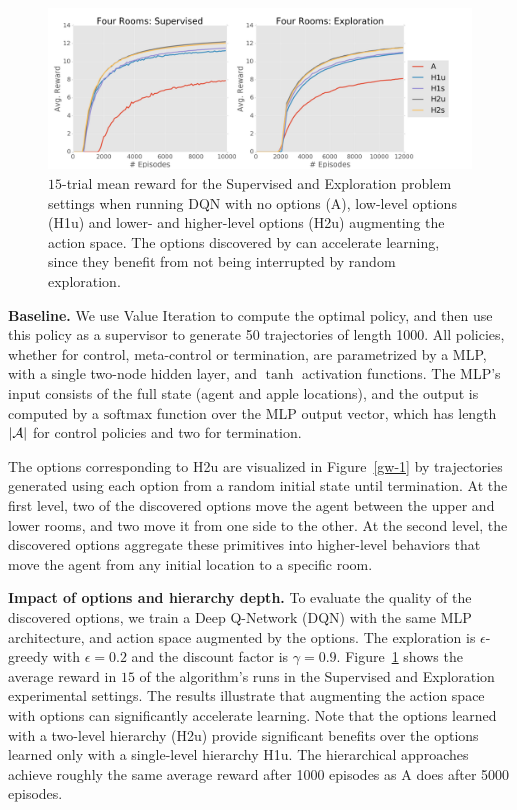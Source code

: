 \begin{figure}[ht!]
    \centering
    \includegraphics[width=\columnwidth]{ddco-experiments/4-rooms-clean.png}
    \caption{$15$-trial mean reward for the Supervised and Exploration problem settings when running DQN with no options (\textsf{A}), low-level options (\textsf{H1u}) and lower- and higher-level options (\textsf{H2u}) augmenting the action space. The options discovered by \alg can accelerate learning, since they benefit from not being interrupted by random exploration.  \label{gw-2}}
\end{figure}

{\bf Baseline.} We use Value Iteration to compute the optimal policy, and then use this policy as a supervisor to generate 50 trajectories of length 1000. All policies, whether for control, meta-control or termination, are parametrized by a MLP, with a single two-node hidden layer, and $\tanh$ activation functions. The MLP's input consists of the full state (agent and apple locations), and the output is computed by a $\mathrm{softmax}$ function over the MLP output vector, which has length $|\mathcal{A}|$ for control policies and two for termination.

The options corresponding to \textsf{H2u} are visualized in Figure~\ref{gw-1} by trajectories generated using each option from a random initial state until termination. At the first level, two of the discovered options move the agent between the upper and lower rooms, and two move it from one side to the other. At the second level, the discovered options aggregate these primitives into higher-level behaviors that move the agent from any initial location to a specific room.

{\bf Impact of options and hierarchy depth.} To evaluate the quality of the discovered options, we train a Deep Q-Network (DQN) with the same MLP architecture, and action space augmented by the options. The exploration is $\epsilon$-greedy with $\epsilon=0.2$ and the discount factor is $\gamma=0.9$. Figure~\ref{gw-2} shows the average reward in $15$ of the algorithm's runs in the Supervised and Exploration experimental settings.
The results illustrate that augmenting the action space with options can significantly accelerate learning. Note that the  options learned with a two-level hierarchy (\textsf{H2u}) provide significant benefits over the options learned only with a single-level hierarchy \textsf{H1u}.
The hierarchical approaches achieve roughly the same average reward after 1000 episodes as \textsf{A} does after 5000 episodes.

